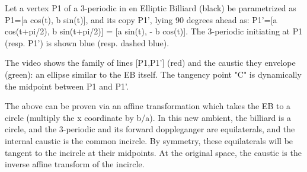 Let a vertex P1 of a 3-periodic in en Elliptic Billiard (black) be parametrized as P1=[a cos(t), b sin(t)], and its copy P1', lying 90 degrees ahead as: P1'=[a cos(t+pi/2), b sin(t+pi/2)] = [a sin(t), - b cos(t)]. The 3-periodic initiating at P1 (resp. P1') is shown blue (resp. dashed blue).

The video shows the family of lines [P1,P1'] (red) and the caustic they envelope (green): an ellipse similar to the EB itself. The tangency point "C" is dynamically the midpoint between P1 and P1'.

The above can be proven via an affine transformation which takes the EB to a circle (multiply the x coordinate by b/a). In this new ambient, the billiard is a circle, and the 3-periodic and its forward doppleganger are equilaterals, and the internal caustic is the common incircle. By symmetry, these equilaterals will be tangent to the incircle at their midpoints. At the original space, the caustic is the inverse affine transform of the incircle.